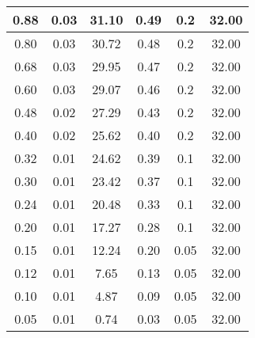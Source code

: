 \documentclass[a4paper, 11pt]{article}
\begin{document}
\begin{longtable}{|c|c|c|c|c|c|}
        \hline 
        0.88 & 0.03 & 31.10 & 0.49 & 0.2 & 32.00 \\
        \hline
        0.80 & 0.03 & 30.72 & 0.48 & 0.2 & 32.00 \\
        \hline 
        0.68 & 0.03 & 29.95 & 0.47 & 0.2 & 32.00 \\
        \hline 
        0.60 & 0.03 & 29.07 & 0.46 & 0.2 & 32.00 \\
        \hline 
        0.48 & 0.02 & 27.29 & 0.43 & 0.2 & 32.00 \\
        \hline
        0.40 & 0.02 & 25.62 & 0.40 & 0.2 & 32.00 \\
        \hline 
        0.32 & 0.01 & 24.62 & 0.39 & 0.1 & 32.00 \\
        \hline 
        0.30 & 0.01 & 23.42 & 0.37 & 0.1 & 32.00 \\
        \hline 
        0.24 & 0.01 & 20.48 & 0.33 & 0.1 & 32.00 \\
        \hline 
        0.20 & 0.01 & 17.27 & 0.28 & 0.1 & 32.00 \\
        \hline 
        0.15 & 0.01 & 12.24 & 0.20 & 0.05 & 32.00 \\
        \hline 
        0.12 & 0.01 & 7.65 & 0.13 &	0.05 & 32.00 \\
        \hline 
        0.10 & 0.01 & 4.87 & 0.09 &	0.05 & 32.00 \\
        \hline 
        0.05 & 0.01 & 0.74 & 0.03 &	0.05 & 32.00 \\
\end{longtable}
\end{document}
